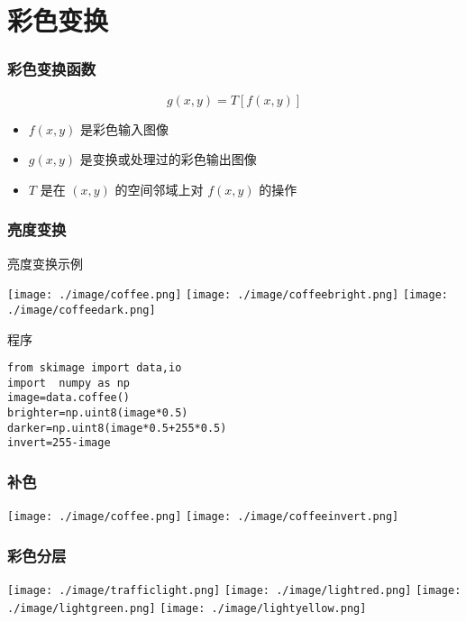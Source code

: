 \documentclass{beamer}
\begin{document}
\section{彩色变换}
\label{sec-5}
\begin{frame}
\frametitle{彩色变换函数}
\label{sec-5-1}


   \[ g(x,y)=T[f(x,y)] \]

\begin{itemize}
\item $f(x,y)$ 是彩色输入图像
\item $g(x,y)$ 是变换或处理过的彩色输出图像
\item $T$ 是在 $(x,y)$ 的空间邻域上对 $f(x,y)$ 的操作
\end{itemize}
\end{frame}
\begin{frame}[fragile]
\frametitle{亮度变换}
\label{sec-5-2}
\begin{block}{亮度变换示例}
\label{sec-5-2-1}

\texttt{[image: ./image/coffee.png]}
\texttt{[image: ./image/coffeebright.png]}
\texttt{[image: ./image/coffeedark.png]}
\end{block}
\begin{block}{程序}
\label{sec-5-2-2}


\begin{verbatim}
from skimage import data,io
import  numpy as np
image=data.coffee()
brighter=np.uint8(image*0.5)
darker=np.uint8(image*0.5+255*0.5)
invert=255-image
\end{verbatim}
\end{block}
\end{frame}
\begin{frame}
\frametitle{补色}
\label{sec-5-3}

\texttt{[image: ./image/coffee.png]}
\texttt{[image: ./image/coffeeinvert.png]}
\end{frame}
\begin{frame}
\frametitle{彩色分层}
\label{sec-5-4}

\texttt{[image: ./image/trafficlight.png]}
\texttt{[image: ./image/lightred.png]}
\texttt{[image: ./image/lightgreen.png]}
\texttt{[image: ./image/lightyellow.png]}
\end{frame}
\end{document}
